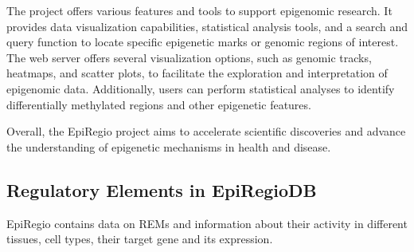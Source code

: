 \documentclass[pdftex,12pt,a4paper]{report}
\begin{document}
The project offers various features and tools to support epigenomic research. It provides data visualization capabilities, statistical analysis tools, and a search and query function to locate specific epigenetic marks or genomic regions of interest. The web server offers several visualization options, such as genomic tracks, heatmaps, and scatter plots, to facilitate the exploration and interpretation of epigenomic data. Additionally, users can perform statistical analyses to identify differentially methylated regions and other epigenetic features.

Overall, the EpiRegio project aims to accelerate scientific discoveries and advance the understanding of epigenetic mechanisms in health and disease.


\subsection{Regulatory Elements in EpiRegioDB}
EpiRegio contains data on REMs and information about their activity in different tissues, cell types, their target gene and its expression\cite{regelements}. 
\end{document}
